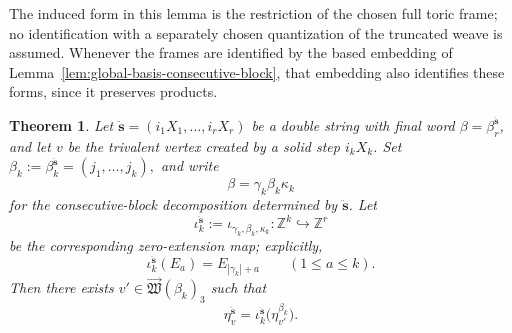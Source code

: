 \documentclass[12pt, reqno]{amsart}
\theoremstyle{plain}
\newtheorem{theorem}{Theorem}[section]
\theoremstyle{definition}
\numberwithin{equation}{section}
\newcommand{\ZZ}{\mathbb{Z}}
\begin{document}
The induced form in this lemma is the restriction of the chosen
full toric frame; no identification with a separately chosen
quantization of the truncated weave is assumed. Whenever the frames
are identified by the based embedding of
Lemma~\ref{lem:global-basis-consecutive-block}, that embedding also
identifies these forms, since it preserves products.

\begin{theorem}\label{thm:vector-double-inductive}
Let
\(
    \ddot{\mathbf s}
    =(i_1X_1,\ldots,i_rX_r)
\)
be a double string with final word
\(\beta=\beta_r^{\ddot{\mathbf s}}\), and let \(v\) be the
trivalent vertex created by a solid step \(i_kX_k\). Set
\(
    \beta_k
    :=\beta_k^{\ddot{\mathbf s}}
    =(j_1,\ldots,j_k),
\)
and write
\[
    \beta=\gamma_k\beta_k\kappa_k
\]
for the consecutive-block decomposition determined by
\(\ddot{\mathbf s}\). Let
\[
    \iota_k^{\ddot{\mathbf s}}
    :=
    \iota_{\gamma_k,\beta_k,\kappa_k}
    \colon\ZZ^k\hookrightarrow\ZZ^r
\]
be the corresponding zero-extension map; explicitly,
\[
    \iota_k^{\ddot{\mathbf s}}(E_a)
    =
    E_{|\gamma_k|+a}
    \qquad(1\leq a\leq k).
\]
Then there exists
\(
    v'\in
    \overrightarrow{\mathfrak W}(\beta_k)_3
\)
such that
\begin{equation}\label{eq:eta-double-string}
    \eta_v^{\ddot{\mathbf s}}
    =
    \iota_k^{\ddot{\mathbf s}}
    \bigl(\eta_{v'}^{\beta_k}\bigr).
\end{equation}
\end{theorem}
\end{document}
